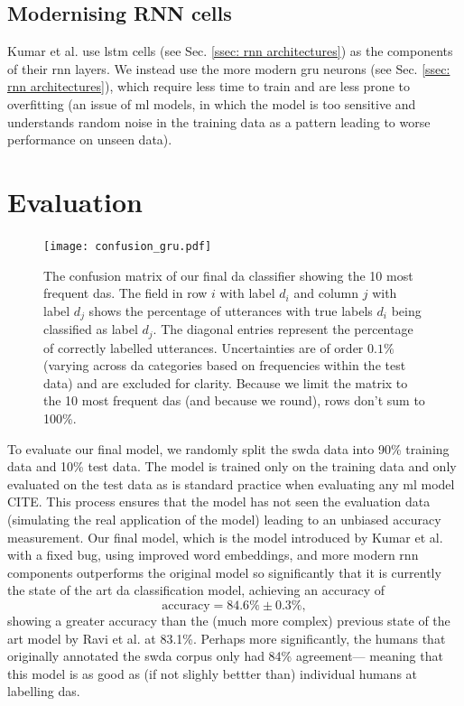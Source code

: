     \subsection{Modernising RNN cells}
    Kumar et al.\cite{kumar2017dialogue} use \gls{lstm} cells (see Sec. \ref{ssec: rnn architectures}) as the components of their \gls{rnn} layers. We instead use the more modern \gls{gru}\cite{chung2014empirical} \glspl{neuron} (see Sec. \ref{ssec: rnn architectures}), which require less time to train and are less prone to overfitting (an issue of \gls{ml} models, in which the \gls{model} is too sensitive and understands random noise in the training data as a pattern leading to worse performance on unseen data)\cite{chung2014empirical}.

    \section{Evaluation \label{ssec: method my da model evaluation}}
    
    \begin{figure}[t!]
        \centering
        \texttt{[image: confusion\_gru.pdf]}
        \caption{The confusion matrix of our final \gls{da} classifier showing the 10 most frequent \glspl{da}. The field in row $i$ with label $d_i$ and column $j$ with label $d_j$ shows the percentage of \glspl{utterance} with true labels $d_i$ being classified as label $d_j$. The diagonal entries represent the percentage of correctly labelled \glspl{utterance}. Uncertainties are of order $0.1\%$ (varying across \gls{da} categories based on frequencies within the test data) and are excluded for clarity. Because we limit the matrix to the 10 most frequent \glspl{da} (and because we round), rows don't sum to 100\%.}
        \label{fig:confusion}
    \end{figure}

    To evaluate our final \gls{model}, we randomly split the \gls{swda} data into 90\% training data and 10\% test data. The \gls{model} is trained only on the training data and only evaluated on the test data as is standard practice when evaluating any \gls{ml} \gls{model} CITE. This process ensures that the \gls{model} has not seen the evaluation data (simulating the real application of the \gls{model}) leading to an unbiased accuracy measurement.
    Our final \gls{model}, which is the \gls{model} introduced by Kumar et al.\cite{kumar2017dialogue} with a fixed bug, using improved word \glspl{embedding}, and more modern \gls{rnn} components outperforms the original \gls{model} so significantly that it is currently the state of the art \gls{da} classification \gls{model}, achieving an accuracy of
    \begin{equation}
        \text{accuracy} = 84.6 \% \pm 0.3\%,
        \label{eq: my da model accuracy}
    \end{equation}
    showing a greater accuracy than the (much more complex) previous state of the art \gls{model} by Ravi et al. at 83.1\%\cite{ravi2018self}. Perhaps more significantly, the humans that originally annotated the \gls{swda} corpus only had 84\% agreement\cite{swda}--- meaning that this \gls{model} is as good as (if not slighly bettter than) individual humans at labelling \glspl{da}. 
    
